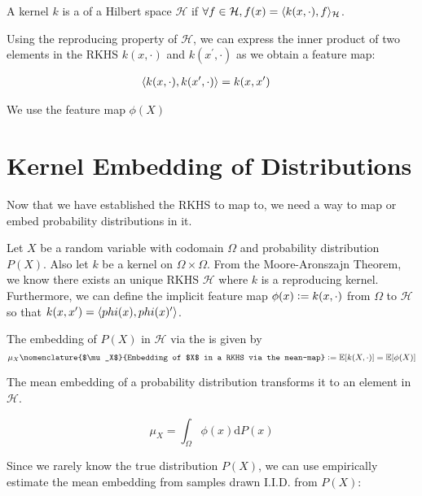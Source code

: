 \begin{definition}
	A kernel $k$ is a  of a Hilbert space $\mathcal{H}$ if $\forall f \in \mathcal{H}, f(x) = \langle k(x, \cdot), f\rangle_\mathcal{H}$.
\end{definition}

Using the reproducing property of $\mathcal{H}$, we can express the inner product of two elements in the RKHS $k(x, \cdot)$ and $k(x^\prime, \cdot)$ as we obtain a feature map:

\begin{align}
	\langle k(x, \cdot), k(x^\prime, \cdot)\rangle &= k(x, x^\prime)
\end{align}

We use the feature map $\phi(X)$



\section{Kernel Embedding of Distributions}
Now that we have established the RKHS to map to, we need a way to map or embed probability distributions in it.

Let $X$ be a random variable with codomain $\Omega$ and probability distribution $P(X)$. Also let $k$ be a kernel on $\Omega \times \Omega$. From the Moore-Aronszajn Theorem, we know there exists an unique RKHS $\mathcal{H}$ where $k$ is a reproducing kernel. Furthermore, we can define the implicit feature map $\phi(x) \vcentcolon= k(x, \cdot)$ from $\Omega$ to $\mathcal{H}$ so that $k(x, x^\prime) = \langle phi(x), phi(x)^\prime\rangle$.

\begin{definition}
The embedding of $P(X)$ in $\mathcal{H}$ via the  is given by
\begin{equation}
  \mu_{X}\nomenclature{$\mu_X$}{Embedding of $X$ in a RKHS via the mean-map} \defeq \E[k(X, \cdot)] = \E[\phi(X)]
\end{equation}
\end{definition}

The mean embedding of a probability distribution transforms it to an element in $\mathcal{H}$.

\begin{equation}
  \mu_{X} = \int_\Omega \phi(x) \mathrm{d}P(x)
\end{equation}

Since we rarely know the true distribution $P(X)$, we can use empirically estimate the mean embedding from samples drawn I.I.D. from $P(X)$:

